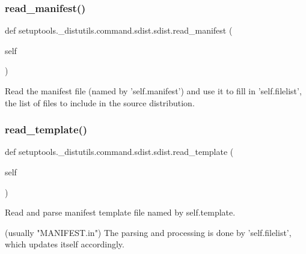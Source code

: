 \subsubsection{\texorpdfstring{read\+\_\+manifest()}{read\_manifest()}}
{\footnotesize\ttfamily def setuptools.\+\_\+distutils.\+command.\+sdist.\+sdist.\+read\+\_\+manifest (\begin{DoxyParamCaption}\item[{}]{self }\end{DoxyParamCaption})}

\begin{DoxyVerb}Read the manifest file (named by 'self.manifest') and use it to
fill in 'self.filelist', the list of files to include in the source
distribution.
\end{DoxyVerb}
 \mbox{\label{classsetuptools_1_1__distutils_1_1command_1_1sdist_1_1sdist_a9c5e2b9c5a346a86c631627a7880826f}} 
\subsubsection{\texorpdfstring{read\+\_\+template()}{read\_template()}}
{\footnotesize\ttfamily def setuptools.\+\_\+distutils.\+command.\+sdist.\+sdist.\+read\+\_\+template (\begin{DoxyParamCaption}\item[{}]{self }\end{DoxyParamCaption})}

\begin{DoxyVerb}Read and parse manifest template file named by self.template.

(usually "MANIFEST.in") The parsing and processing is done by
'self.filelist', which updates itself accordingly.
\end{DoxyVerb}
 \mbox{\label{classsetuptools_1_1__distutils_1_1command_1_1sdist_1_1sdist_a0db02603538670a4ed6271db54919353}} 
